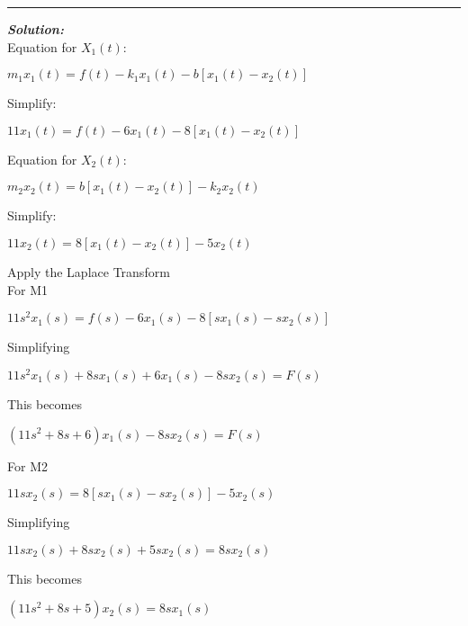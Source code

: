 \documentclass[11pt,letterpaper]{article}
\begin{document}
\rule{\textwidth}{1pt}
\vspace{12pt}
\textit{\textbf{Solution:}}\\
Equation for $X_1(t)$:\\
\begin{center}
	$m_1x_1(t)=f(t)-k_1x_1(t)-b[x_1(t)-x_2(t)]$\\
\end{center}
Simplify:\\
\begin{center}
	$11x_1(t)=f(t)-6x_1(t)-8[x_1(t)-x_2(t)]$\\
\end{center}
Equation for $X_2(t)$:\\
\begin{center}
	$m_2x_2(t)=b[x_1(t)-x_2(t)]-k_2x_2(t)$\\
\end{center}
Simplify:\\
\begin{center}
	$11x_2(t)=8[x_1(t)-x_2(t)]-5x_2(t)$\\
\end{center}
Apply the Laplace Transform\\[12pt]
For M1\\
\begin{center}
	$11s^2x_1(s)=f(s)-6x_1(s)-8[sx_1(s)-sx_2(s)]$\\
\end{center}
Simplifying\\
\begin{center}
	$11s^2x_1(s)+8sx_1(s)+6x_1(s)-8sx_2(s)=F(s)$\\
\end{center}
This becomes\\
\begin{center}
	$(11s^2+8s+6)x_1(s)-8sx_2(s)=F(s)$\\
\end{center}
For M2\\
\begin{center}
	$11sx_2(s)=8[sx_1(s)-sx_2(s)]-5x_2(s)$\\
\end{center}
Simplifying\\
\begin{center}
	$11sx_2(s)+8sx_2(s)+5sx_2(s)=8sx_2(s)$\\
\end{center}
This becomes\\
\begin{center}
	$(11s^2+8s+5)x_2(s)=8sx_1(s)$\\
\end{center}
\end{document}
